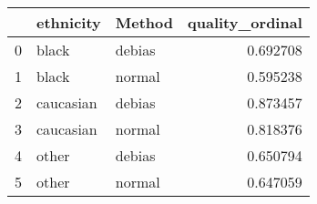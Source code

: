 \begin{tabular}{lllr}
\toprule
 & ethnicity & Method & quality_ordinal \\
\midrule
0 & black & debias & 0.692708 \\
1 & black & normal & 0.595238 \\
2 & caucasian & debias & 0.873457 \\
3 & caucasian & normal & 0.818376 \\
4 & other & debias & 0.650794 \\
5 & other & normal & 0.647059 \\
\bottomrule
\end{tabular}
